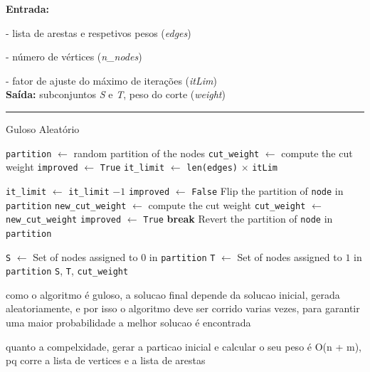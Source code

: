 \documentclass[mirror, portugues]{revdetua}
\begin{document}
\begin{algorithm}[H]
\raggedright
\textbf{Entrada:}

- lista de arestas e respetivos pesos (\textit{edges})

- número de vértices (\textit{n\_nodes})

- fator de ajuste do máximo de iterações (\textit{itLim})\\
\textbf{Saída:} subconjuntos \textit{S} e \textit{T}, peso do corte (\textit{weight}) \\
\hrule 
\caption{Guloso Aleatório}
\begin{algorithmic}[1]
    \State \texttt{partition} $\gets$ random partition of the nodes
    \State \texttt{cut\_weight} $\gets$ compute the cut weight
    \State \texttt{improved} $\gets$ \texttt{True}
    \State \texttt{it\_limit} $\gets$ \texttt{len(edges)} \ensuremath{\times} \texttt{itLim}

        \State \texttt{it\_limit} $\gets$ \texttt{it\_limit} $ - 1$
        \State \texttt{improved} $\gets$ \texttt{False}
            \State Flip the partition of \texttt{node} in \texttt{partition}
            \State \texttt{new\_cut\_weight} $\gets$ compute the cut weight
                \State \texttt{cut\_weight} $\gets$ \texttt{new\_cut\_weight}
                \State \texttt{improved} $\gets$ \texttt{True}
                \State \textbf{break}  
            \EndIf
            \State Revert the partition of \texttt{node} in \texttt{partition}
        \EndFor
    \EndWhile

    \State \texttt{S} $\gets$ Set of nodes assigned to $0$ in \texttt{partition}
    \State \texttt{T} $\gets$ Set of nodes assigned to $1$ in \texttt{partition}
    \Return \texttt{S}, \texttt{T}, \texttt{cut\_weight}
\end{algorithmic}
\end{algorithm}


como o algoritmo é guloso, a solucao final depende da solucao inicial, gerada aleatoriamente, e por isso o algoritmo deve ser corrido varias vezes, para garantir uma maior probabilidade a melhor solucao é encontrada
    
quanto a compelxidade, gerar a particao inicial e calcular o seu peso é O(n + m), pq corre a lista de vertices e a lista de arestas
\end{document}
